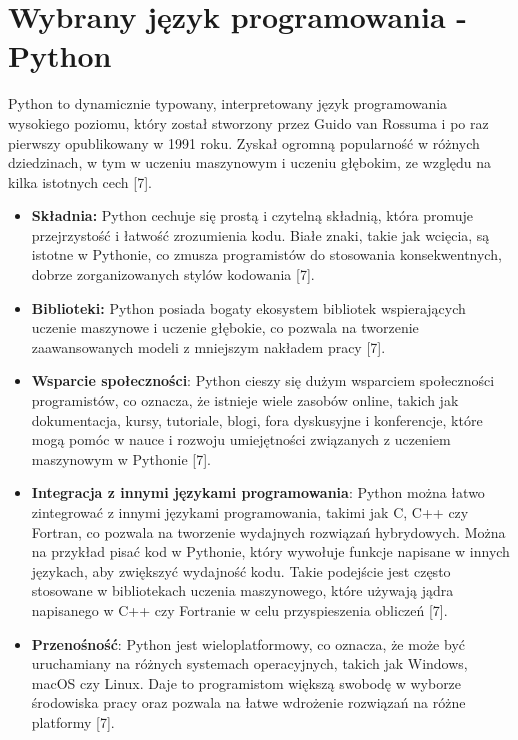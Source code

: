 \section{Wybrany język programowania - Python}

Python to dynamicznie typowany, interpretowany język programowania wysokiego poziomu, który został stworzony przez Guido van Rossuma i po raz pierwszy opublikowany w 1991 roku. Zyskał ogromną popularność w różnych dziedzinach, w tym w uczeniu maszynowym i uczeniu głębokim, ze względu na kilka istotnych cech [7].

\begin{itemize}
\item \textbf{Składnia:} Python cechuje się prostą i czytelną składnią, która promuje przejrzystość i łatwość zrozumienia kodu. Białe znaki, takie jak wcięcia, są istotne w Pythonie, co zmusza programistów do stosowania konsekwentnych, dobrze zorganizowanych stylów kodowania [7].

\item \textbf{Biblioteki:} Python posiada bogaty ekosystem bibliotek wspierających uczenie maszynowe i uczenie głębokie, co pozwala na tworzenie zaawansowanych modeli z mniejszym nakładem pracy [7].

\item \textbf{Wsparcie społeczności}: Python cieszy się dużym wsparciem społeczności programistów, co oznacza, że istnieje wiele zasobów online, takich jak dokumentacja, kursy, tutoriale, blogi, fora dyskusyjne i konferencje, które mogą pomóc w nauce i rozwoju umiejętności związanych z uczeniem maszynowym w Pythonie [7].

\item \textbf{Integracja z innymi językami programowania}: Python można łatwo zintegrować z innymi językami programowania, takimi jak C, C++ czy Fortran, co pozwala na tworzenie wydajnych rozwiązań hybrydowych. Można na przykład pisać kod w Pythonie, który wywołuje funkcje napisane w innych językach, aby zwiększyć wydajność kodu. Takie podejście jest często stosowane w bibliotekach uczenia maszynowego, które używają jądra napisanego w C++ czy Fortranie w celu przyspieszenia obliczeń [7].

\item \textbf{Przenośność}: Python jest wieloplatformowy, co oznacza, że może być uruchamiany na różnych systemach operacyjnych, takich jak Windows, macOS czy Linux. Daje to programistom większą swobodę w wyborze środowiska pracy oraz pozwala na łatwe wdrożenie rozwiązań na różne platformy [7].

\end{itemize}
